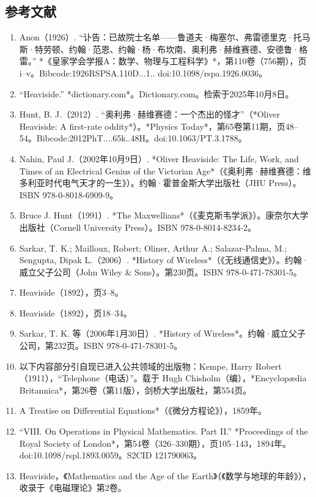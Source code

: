 \subsection{参考文献}
\begin{enumerate}
\item Anon（1926）. “讣告：已故院士名单——鲁道夫·梅塞尔、弗雷德里克·托马斯·特劳顿、约翰·范恩、约翰·杨·布坎南、奥利弗·赫维赛德、安德鲁·格雷。” *《皇家学会学报A：数学、物理与工程科学》*，第110卷（756期），页 i–v。Bibcode:1926RSPSA.110D...1.. doi:10.1098/rspa.1926.0036。
\item “Heaviside.” *dictionary.com*。Dictionary.com。检索于2025年10月8日。
\item Hunt, B. J.（2012）. “奥利弗·赫维赛德：一个杰出的怪才”（*Oliver Heaviside: A first-rate oddity*）。*Physics Today*，第65卷第11期，页48–54。Bibcode:2012PhT....65k..48H。doi:10.1063/PT.3.1788。
\item Nahin, Paul J.（2002年10月9日）. *Oliver Heaviside: The Life, Work, and Times of an Electrical Genius of the Victorian Age*（《奥利弗·赫维赛德：维多利亚时代电气天才的一生》）。约翰·霍普金斯大学出版社（JHU Press）。ISBN 978-0-8018-6909-9。
\item Bruce J. Hunt（1991）. *The Maxwellians*（《麦克斯韦学派》）。康奈尔大学出版社（Cornell University Press）。ISBN 978-0-8014-8234-2。
\item Sarkar, T. K.; Mailloux, Robert; Oliner, Arthur A.; Salazar-Palma, M.; Sengupta, Dipak L.（2006）. *History of Wireless*（《无线通信史》）。约翰·威立父子公司（John Wiley & Sons）。第230页。ISBN 978-0-471-78301-5。
\item Heaviside（1892），页3–8。
\item Heaviside（1892），页18–34。
\item Sarkar, T. K. 等（2006年1月30日）. *History of Wireless*。约翰·威立父子公司，第232页。ISBN 978-0-471-78301-5。
\item 以下内容部分引自现已进入公共领域的出版物：Kempe, Harry Robert（1911），“Telephone（电话）”。载于 Hugh Chisholm（编），*Encyclopædia Britannica*，第26卷（第11版），剑桥大学出版社，第554页。
\item A Treatise on Differential Equations*（《微分方程论》），1859年。
\item “VIII. On Operations in Physical Mathematics. Part II.” *Proceedings of the Royal Society of London*，第54卷（326–330期），页105–143，1894年。doi:10.1098/rspl.1893.0059。S2CID 121790063。
\item Heaviside，《Mathematics and the Age of the Earth》（《数学与地球的年龄》），收录于《电磁理论》第2卷。

\end{enumerate}
